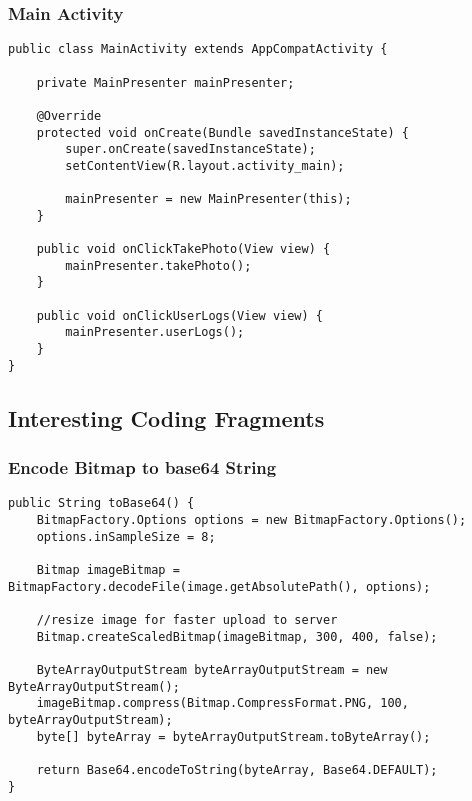 \subsubsection*{Main Activity}
\begin{lstlisting}[style=Java]
public class MainActivity extends AppCompatActivity {

    private MainPresenter mainPresenter;

    @Override
    protected void onCreate(Bundle savedInstanceState) {
        super.onCreate(savedInstanceState);
        setContentView(R.layout.activity_main);

        mainPresenter = new MainPresenter(this);
    }

    public void onClickTakePhoto(View view) {
        mainPresenter.takePhoto();
    }

    public void onClickUserLogs(View view) {
        mainPresenter.userLogs();
    }
}
\end{lstlisting}

\subsection*{Interesting Coding Fragments}

\subsubsection*{Encode Bitmap to base64 String}
\begin{lstlisting}[style=Java]
public String toBase64() {
    BitmapFactory.Options options = new BitmapFactory.Options();
    options.inSampleSize = 8;

    Bitmap imageBitmap = BitmapFactory.decodeFile(image.getAbsolutePath(), options);

    //resize image for faster upload to server
    Bitmap.createScaledBitmap(imageBitmap, 300, 400, false);
    
    ByteArrayOutputStream byteArrayOutputStream = new ByteArrayOutputStream();
    imageBitmap.compress(Bitmap.CompressFormat.PNG, 100, byteArrayOutputStream);
    byte[] byteArray = byteArrayOutputStream.toByteArray();

    return Base64.encodeToString(byteArray, Base64.DEFAULT);
}
\end{lstlisting}






